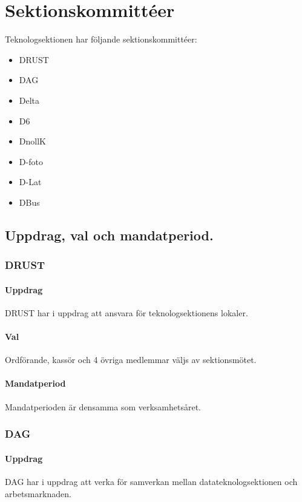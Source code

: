 \section{Sektionskommittéer}

Teknologsektionen har följande sektionskommittéer: 
\begin{itemize}
  \item DRUST 
  \item DAG 
  \item Delta 
  \item D6 
  \item DnollK
  \item D-foto
  \item D-Lat
  \item DBus
\end{itemize}

\subsection{Uppdrag, val och mandatperiod.}

\subsubsection{DRUST} 

\paragraph{Uppdrag}
DRUST har i uppdrag att ansvara för teknologsektionens lokaler.

\paragraph{Val}
Ordförande, kassör och 4 övriga medlemmar väljs av sektionsmötet. 

\paragraph{Mandatperiod}
Mandatperioden är densamma som verksamhetsåret. 

\subsubsection{DAG}

\paragraph{Uppdrag} 
DAG har i uppdrag att verka för samverkan mellan datateknologsektionen och arbetsmarknaden. 

